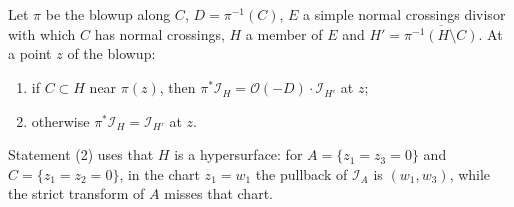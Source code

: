 \begin{theorem}
\label{bcalc:member-pullback}
\mixedleanok
Let \(\pi\) be the blowup along \(C\), \(D=\pi^{-1}(C)\), \(E\) a simple normal crossings divisor with which \(C\) has normal crossings, \(H\) a member of
\(E\) and \(H'=\overline{\pi^{-1}(H\setminus C)}\). At a point \(z\) of the blowup:
\begin{enumerate}
\item if \(C\subset H\) near \(\pi(z)\), then \(\pi^*\mathcal I_H=\mathcal O(-D)\cdot\mathcal I_{H'}\) at \(z\);
\item otherwise \(\pi^*\mathcal I_H=\mathcal I_{H'}\) at \(z\).
\end{enumerate}
Statement (2) uses that \(H\) is a hypersurface: for \(A=\{z_1=z_3=0\}\) and \(C=\{z_1=z_2=0\}\), in the chart \(z_1=w_1\) the pullback of
\(\mathcal I_A\) is \((w_1,w_3)\), while the strict transform of \(A\) misses that chart.
\end{theorem}
